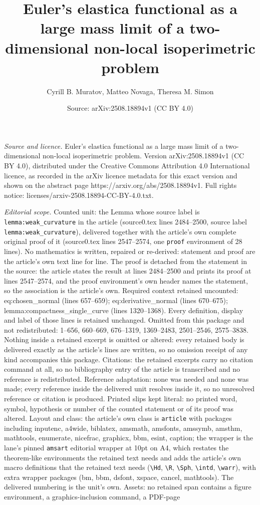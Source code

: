 \documentclass[10pt,a4paper]{amsart}
\title[Euler's elastica functional as a large mass limit of a two-d]{Euler's elastica functional as a large mass limit of a two-dimensional non-local isoperimetric problem}
\author{Cyrill B. Muratov, Matteo Novaga, Theresa M. Simon}
\date{Source: arXiv:2508.18894v1 (CC BY 4.0)}
\begin{document}
\maketitle

\noindent\emph{Source and licence.} Euler's elastica functional as a large mass limit of a two-dimensional non-local isoperimetric problem. Version arXiv:2508.18894v1 (CC BY 4.0), distributed under the Creative Commons Attribution 4.0 International licence, as recorded in the arXiv licence metadata for this exact version and shown on the abstract page https://arxiv.org/abs/2508.18894v1. Full rights notice: licenses/arxiv-2508.18894-CC-BY-4.0.txt.\par\smallskip

\noindent\textit{Editorial scope.} Counted unit: the Lemma whose source label is \texttt{lemma:weak\_curvature} in the article (source0.tex lines 2484--2500, source label \texttt{lemma:weak\_curvature}), delivered together with the article's own complete original proof of it (source0.tex lines 2547--2574, one \texttt{proof} environment of 28 lines). No mathematics is written, repaired or re-derived: statement and proof are the article's own text line for line. The proof is detached from the statement in the source: the article states the result at lines 2484--2500 and prints its proof at lines 2547--2574, and the proof environment's own header names the statement, so the association is the article's own. Required context retained uncounted: eq:chosen\_normal (lines 657--659); eq:derivative\_normal (lines 670--675); lemma:compactness\_single\_curve (lines 1320--1368). Every definition, display and label of those lines is retained unchanged. Omitted from this package and not redistributed: 1--656, 660--669, 676--1319, 1369--2483, 2501--2546, 2575--3838. Nothing inside a retained excerpt is omitted or altered: every retained body is delivered exactly as the article's lines are written, so no omission receipt of any kind accompanies this package. Citations: the retained excerpts carry no citation command at all, so no bibliography entry of the article is transcribed and no reference is redistributed. Reference adaptation: none was needed and none was made; every reference inside the delivered unit resolves inside it, so no unresolved reference or citation is produced. Printed slips kept literal: no printed word, symbol, hypothesis or number of the counted statement or of its proof was altered. Layout and class: the article's own class is \texttt{article} with packages including inputenc, a4wide, biblatex, amsmath, amsfonts, amssymb, amsthm, mathtools, enumerate, nicefrac, graphicx, bbm, esint, caption; the wrapper is the lane's pinned \texttt{amsart} editorial wrapper at 10pt on A4, which restates the theorem-like environments the retained text needs and adds the article's own macro definitions that the retained text needs (\texttt{\textbackslash Hd}, \texttt{\textbackslash R}, \texttt{\textbackslash Sph}, \texttt{\textbackslash intd}, \texttt{\textbackslash warr}), with extra wrapper packages (bm, bbm, dsfont, xspace, cancel, mathtools). The delivered numbering is the unit's own. Assets: no retained span contains a figure environment, a graphics-inclusion command, a PDF-page 
\end{document}
